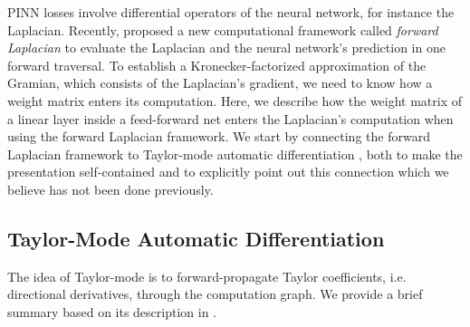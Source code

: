 PINN losses involve differential operators of the neural network, for instance the Laplacian.
Recently, \citet{li2023forward} proposed a new computational framework called \emph{forward Laplacian} to evaluate the Laplacian and the neural network's prediction in one forward traversal.
To establish a Kronecker-factorized approximation of the Gramian, which consists of the Laplacian's gradient, we need to know how a weight matrix enters its computation.
Here, we describe how the weight matrix of a linear layer inside a feed-forward net enters the Laplacian's computation when using the forward Laplacian framework.
We start by connecting the forward Laplacian framework to Taylor-mode automatic differentiation \citep{griewank2008evaluating,bettencourt2019taylor}, both to make the presentation self-contained and to explicitly point out this connection which we believe has not been done previously.

\subsection{Taylor-Mode Automatic Differentiation}
The idea of Taylor-mode is to forward-propagate Taylor coefficients, i.e.\,directional derivatives, through the computation graph. We provide a brief summary based on its description in \cite{bettencourt2019taylor}.

